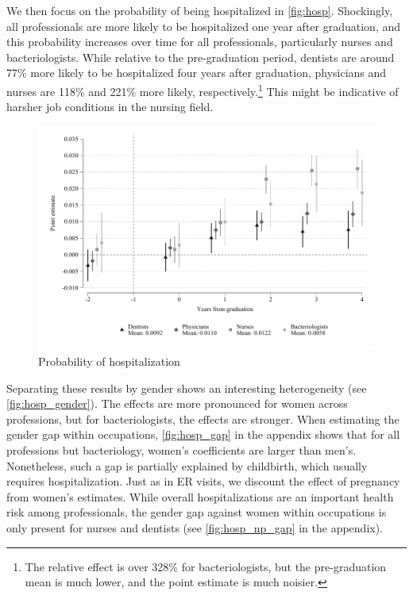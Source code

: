 \documentclass[12pt, a4paper]{article}
\begin{document}
We then focus on the probability of being hospitalized in \autoref{fig:hosp}. Shockingly, all professionals are more likely to be hospitalized one year after graduation, and this probability increases over time for all professionals, particularly nurses and bacteriologists. While relative to the pre-graduation period, dentists are around 77\% more likely to be hospitalized four years after graduation, physicians and nurses are 118\% and 221\% more likely, respectively.\footnote{The relative effect is over 328\% for bacteriologists, but the pre-graduation mean is much lower, and the point estimate is much noisier.} This might be indicative of harsher job conditions in the nursing field.

\begin{figure}[H]
\caption{Probability of hospitalization}\label{fig:hosp}
\centering 
\includegraphics[width=\textwidth]{Figures/Callaway SantAnna/ES_hosp_all.pdf}
\end{figure}

Separating these results by gender shows an interesting heterogeneity (see \autoref{fig:hosp_gender}). The effects are more pronounced for women across professions, but for bacteriologists, the effects are stronger. When estimating the gender gap within occupations, \autoref{fig:hosp_gap} in the appendix shows that for all professions but bacteriology, women's coefficients are larger than men's. Nonetheless, such a gap is partially explained by childbirth, which usually requires hospitalization. Just as in ER visits, we discount the effect of pregnancy from women's estimates. While overall hospitalizations are an important health risk among professionals, the gender gap against women within occupations is only present for nurses and dentists (see \autoref{fig:hosp_np_gap} in the appendix). 
\end{document}
